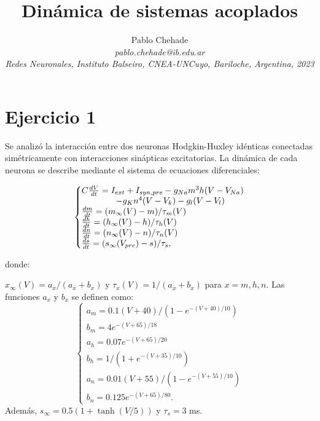 \documentclass[aps,prb,twocolumn,superscriptaddress,floatfix,longbibliography]{revtex4-2}
\newcounter{para}
\begin{document}
\newcommand{\mytitle}{Dinámica de sistemas acoplados}

\title{\mytitle}

\author{Pablo Chehade \\
    \small \textit{pablo.chehade@ib.edu.ar} \\
    \small \textit{Redes Neuronales, Instituto Balseiro, CNEA-UNCuyo, Bariloche, Argentina, 2023} \\}
    
    
    
\maketitle



\section{Ejercicio 1}
Se analizó la interacción entre dos neuronas Hodgkin-Huxley idénticas conectadas simétricamente con interacciones sinápticas excitatorias. La dinámica de cada neurona se describe mediante el sistema de ecuaciones diferenciales:

\begin{equation}
\left\{\begin{array}{@{}l@{}}
    C \frac{dV}{dt} = I_{ext} + I_{syn,pre} - g_{Na}m^3h(V-V_{Na}) \\ 
    \hspace{4em} - g_{K}n^4(V - V_k) - g_l(V-V_l)    \\
    \frac{dm}{dt} = (m_\infty(V) - m)/\tau_m(V)    \\
    \frac{dh}{dt} = (h_\infty(V) - h)/\tau_h(V)    \\
    \frac{dn}{dt} = (n_\infty(V) - n)/\tau_n(V)    \\
    \frac{ds}{dt} = (s_\infty(V_{pre}) - s)/\tau_s,
    \end{array}\right.
    \label{eq:ej1_ecs_difs}
\end{equation}

donde:

$x_\infty(V) = a_x/(a_x + b_x)$ y $\tau_x(V) = 1/(a_x + b_x)$ para $x = m, h, n$. Las funciones $a_x$ y $b_x$ se definen como:
\[
\left\{\begin{matrix}
    a_m = 0.1(V + 40)/(1 - e^{-(V+40)/10}) \\
    b_m = 4 e^{- (V + 65)/18}    \\
    a_h = 0.07 e^{- (V+65)/20} \\ 
    b_h = 1/(1 + e^{- (V+35)/10})    \\
    a_n = 0.01(V+55)/(1-e^{-(V+55)/10}) \\
    b_n = 0.125 e^{-(V+65)/80}.
    \end{matrix}\right.
\]
Además, $s_\infty = 0.5 (1 + \tanh(V/5))$ y $\tau_s = 3$ ms.
\end{document}
